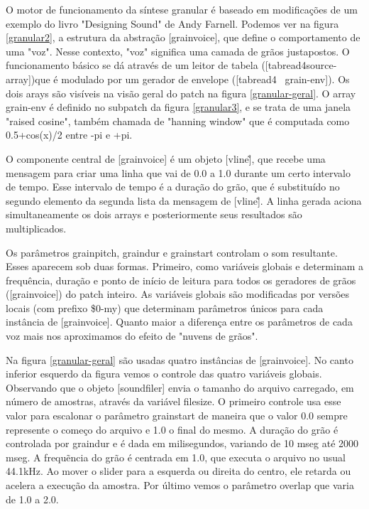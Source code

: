 \documentclass{ppgmus}
\begin{document}
O motor de funcionamento da síntese granular é baseado em modificações de um exemplo
do livro "Designing Sound" de Andy Farnell. Podemos ver na figura \ref{granular2}, a estrutura
da abstração [grainvoice], que define o comportamento de uma "voz". Nesse contexto,
"voz" significa uma camada de grãos justapostos. O funcionamento básico se dá através
de um leitor de tabela ([tabread4\texttildelow source-array])que é modulado por um gerador de envelope ([tabread4~ grain-env]).
Os dois arays são visíveis na visão geral do patch na figura \ref{granular-geral}. O array grain-env
é definido no subpatch da figura \ref{granular3}, e se trata de uma janela "raised cosine", também
chamada de "hanning window" que é computada como 0.5+cos(x)/2 entre -pi e +pi.

O componente central de [grainvoice] é um objeto [vline\~], que recebe uma mensagem para criar uma linha que 
vai de 0.0 a 1.0 durante um certo intervalo de tempo. Esse intervalo de tempo é a duração
do grão, que é substituído no segundo elemento da segunda lista da mensagem de [vline\~].
A linha gerada aciona simultaneamente os dois arrays e posteriormente 
seus resultados são multiplicados.

Os parâmetros grainpitch, graindur e grainstart controlam o som resultante. Esses aparecem sob duas
formas. Primeiro, como variáveis globais e determinam a frequência, duração e ponto de início de leitura para
todos os geradores de grãos ([grainvoice]) do patch inteiro. As variáveis globais são modificadas
por versões locais (com prefixo \$0-my) que determinam parâmetros únicos para cada instância de [grainvoice].
Quanto maior a diferença entre os parâmetros de cada voz mais nos aproximamos do efeito de "nuvens de grãos".

Na figura \ref{granular-geral} são usadas quatro instâncias de [grainvoice]. No canto inferior esquerdo da figura
vemos o controle das quatro variáveis globais. Observando que o objeto [soundfiler] envia o tamanho do arquivo
carregado, em número de amostras, através da variável filesize. O primeiro controle usa esse valor para escalonar
o parâmetro grainstart de maneira que o valor 0.0 sempre represente o começo do arquivo e 1.0 o final do mesmo.
A duração do grão é controlada por graindur e é dada em milisegundos, variando de 10 mseg até 2000 mseg.
A frequẽncia do grão é centrada em 1.0, que executa o arquivo no usual 44.1kHz. Ao mover o slider para a esquerda
ou direita do centro, ele retarda ou acelera a execução da amostra. Por último vemos o parâmetro overlap que varia de
1.0 a 2.0.
\end{document}
